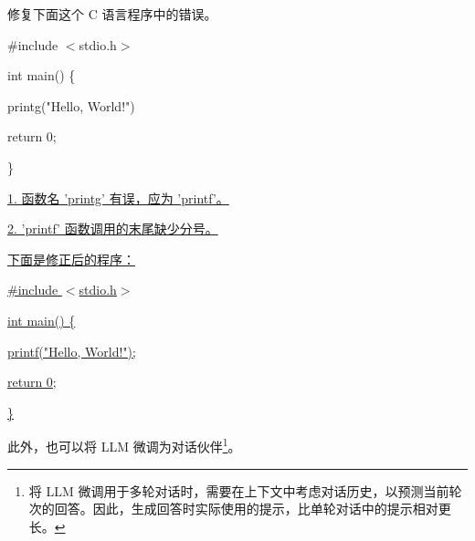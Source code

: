 \vspace{0.5em}
\begin{tcolorbox}
\begin{center}
\parbox{0.9\textwidth}
{

{\color{blue}

修复下面这个 C 语言程序中的错误。

\vspace{0.3em}

\#include $<$stdio.h$>$

int main() \{

   \hspace{2em} printg("Hello, World!")

   \hspace{2em} return 0;

\}

}

\vspace{0.5em}

\underline{1. 函数名 'printg' 有误，应为 'printf'。}

\underline{2. 'printf' 函数调用的末尾缺少分号。}

\vspace{0.3em}

\underline{下面是修正后的程序： }

\vspace{0.3em}

\underline{\#include $<$stdio.h$>$}

\underline{int main() \{}

\hspace{2em} \underline{printf("Hello, World!");}

\hspace{2em} \underline{return 0;}

\underline{\}}

}
\end{center}
\end{tcolorbox}
\vspace{0.5em}

此外，也可以将 LLM 微调为对话伙伴\footnote{将 LLM 微调用于多轮对话时，需要在上下文中考虑对话历史，以预测当前轮次的回答。因此，生成回答时实际使用的提示，比单轮对话中的提示相对更长。}。

